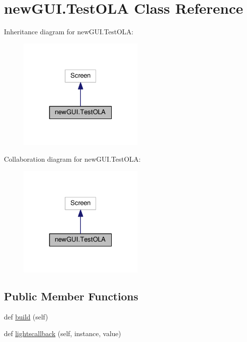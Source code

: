 \hypertarget{classnewGUI_1_1TestOLA}{}\section{new\+G\+U\+I.\+Test\+O\+LA Class Reference}
\label{classnewGUI_1_1TestOLA}


Inheritance diagram for new\+G\+U\+I.\+Test\+O\+LA\+:
\nopagebreak
\begin{figure}[H]
\begin{center}
\leavevmode
\includegraphics[width=175pt]{classnewGUI_1_1TestOLA__inherit__graph}
\end{center}
\end{figure}


Collaboration diagram for new\+G\+U\+I.\+Test\+O\+LA\+:
\nopagebreak
\begin{figure}[H]
\begin{center}
\leavevmode
\includegraphics[width=175pt]{classnewGUI_1_1TestOLA__coll__graph}
\end{center}
\end{figure}
\subsection*{Public Member Functions}
\begin{DoxyCompactItemize}
\item 
def \hyperlink{classnewGUI_1_1TestOLA_a80118c064d3ed89d24f0ff76e847bed9}{build} (self)
\item 
def \hyperlink{classnewGUI_1_1TestOLA_a3d1b265bdb9d7044c3e9a0d45ee36d0b}{lightscallback} (self, instance, value)
\end{DoxyCompactItemize}
